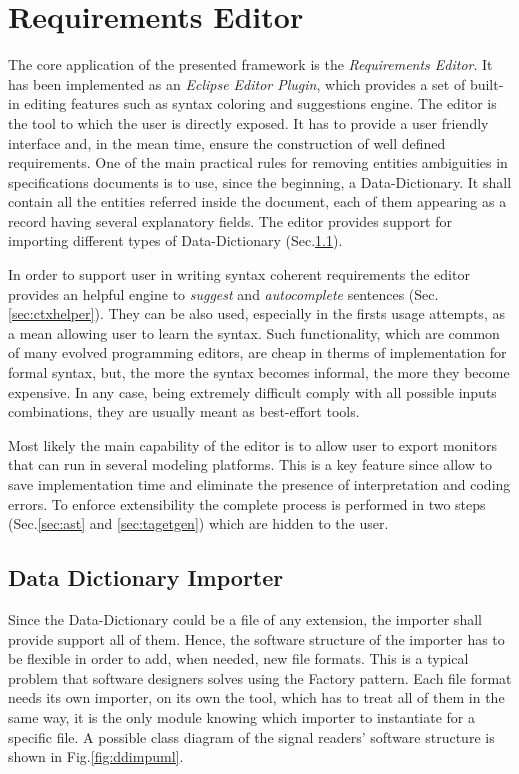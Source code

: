 \section{Requirements Editor}

The core application of the presented framework is the \textit{Requirements Editor}. It has been implemented as an \textit{Eclipse Editor Plugin}, which provides a set of built-in editing features such as syntax coloring and suggestions engine. The editor is the tool to which the user is directly exposed. It has to provide a user friendly interface and, in the mean time, ensure the construction of well defined requirements. One of the main practical rules for removing entities ambiguities in specifications documents is to use, since the beginning, a Data-Dictionary. It shall contain all the entities referred inside the document, each of them appearing as a record having several explanatory fields. The editor provides support for importing different types of Data-Dictionary (Sec.\ref{sec:datadictimp}).
\par In order to support user in writing syntax coherent requirements the editor provides an helpful engine to \textit{suggest} and \textit{autocomplete} sentences (Sec.\ref{sec:ctxhelper}). They can be also used, especially in the firsts usage attempts, as a mean allowing user to learn the syntax. Such functionality, which are common of many evolved programming editors, are cheap in therms of implementation for formal syntax, but, the more the syntax becomes informal, the more they become expensive. In any case, being extremely difficult comply with all possible inputs combinations, they are usually meant as best-effort tools. 
\par Most likely the main capability of the editor is to allow user to export monitors that can run in several modeling platforms. This is a key feature since allow to save implementation time and  eliminate the presence of interpretation and coding errors. To enforce extensibility the complete process is performed in two steps (Sec.\ref{sec:ast} and \ref{sec:tagetgen}) which are hidden to the user.

\subsection{Data Dictionary Importer}
\label{sec:datadictimp}

Since the Data-Dictionary could be a file of any extension, the importer shall provide support all of them. Hence, the software structure of the importer has to be flexible in order to add, when needed, new file formats. This is a typical problem that software designers solves using the Factory pattern. Each file format needs its own importer, on its own the tool, which has to treat all of them in the same way, it is the only module knowing which importer to instantiate for a specific file. A possible class diagram of the signal readers' software structure is shown in Fig.\ref{fig:ddimpuml}.

